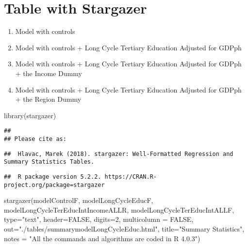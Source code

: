\documentclass[
]{article}
\newenvironment{Shaded}{\begin{snugshade}}{\end{snugshade}}
\newcommand{\AttributeTok}[1]{\textcolor[rgb]{0.77,0.63,0.00}{#1}}
\newcommand{\ConstantTok}[1]{\textcolor[rgb]{0.00,0.00,0.00}{#1}}
\newcommand{\DecValTok}[1]{\textcolor[rgb]{0.00,0.00,0.81}{#1}}
\newcommand{\FunctionTok}[1]{\textcolor[rgb]{0.00,0.00,0.00}{#1}}
\newcommand{\NormalTok}[1]{#1}
\newcommand{\StringTok}[1]{\textcolor[rgb]{0.31,0.60,0.02}{#1}}
\begin{document}
\hypertarget{table-with-stargazer}{%
\section{Table with Stargazer}\label{table-with-stargazer}}

\begin{enumerate}
\def\labelenumi{\arabic{enumi})}
\item
  Model with controls
\item
  Model with controls + Long Cycle Tertiary Education Adjusted for GDPph
\item
  Model with controls + Long Cycle Tertiary Education Adjusted for GDPph
  + the Income Dummy
\item
  Model with controls + Long Cycle Tertiary Education Adjusted for GDPph
  + the Region Dummy
\end{enumerate}

\begin{Shaded}
\begin{Highlighting}[]
\FunctionTok{library}\NormalTok{(stargazer)}
\end{Highlighting}
\end{Shaded}

\begin{verbatim}
## 
## Please cite as:
\end{verbatim}

\begin{verbatim}
##  Hlavac, Marek (2018). stargazer: Well-Formatted Regression and Summary Statistics Tables.
\end{verbatim}

\begin{verbatim}
##  R package version 5.2.2. https://CRAN.R-project.org/package=stargazer
\end{verbatim}

\begin{Shaded}
\begin{Highlighting}[]
\FunctionTok{stargazer}\NormalTok{(modelControlF, modelLongCycleEducF, modelLongCycleTerEducIntIncomeALLR, modelLongCycleTerEducIntALLF, }\AttributeTok{type=}\StringTok{"text"}\NormalTok{, }\AttributeTok{header=}\ConstantTok{FALSE}\NormalTok{, }\AttributeTok{digits=}\DecValTok{2}\NormalTok{, }\AttributeTok{multicolumn =} \ConstantTok{FALSE}\NormalTok{,}
          \AttributeTok{out=}\StringTok{"./tables/summarymodelLongCycleEduc.html"}\NormalTok{, }\AttributeTok{title=}\StringTok{"Summary Statistics"}\NormalTok{,}
          \AttributeTok{notes =} \StringTok{"All the commands and algorithms are coded in R 4.0.3"}\NormalTok{)}
\end{Highlighting}
\end{Shaded}
\end{document}
